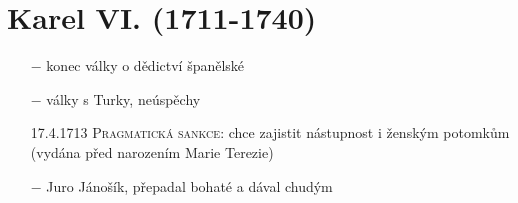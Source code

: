 \documentclass{article}
\begin{document}
\section*{Karel VI. (1711-1740)}
\begin{itemize}
    \vspace{-0.5em}
    \setlength\itemsep{0.15em}
    \item[$-$] konec války o dědictví španělské
    \item[$-$] války s Turky, neúspěchy
    \item[17.4.1713] \textsc{Pragmatická sankce}: chce zajistit nástupnost i ženským potomkům (vydána před narozením Marie Terezie)
    \item[$-$] Juro Jánošík, přepadal bohaté a dával chudým
\end{itemize}
\end{document}
